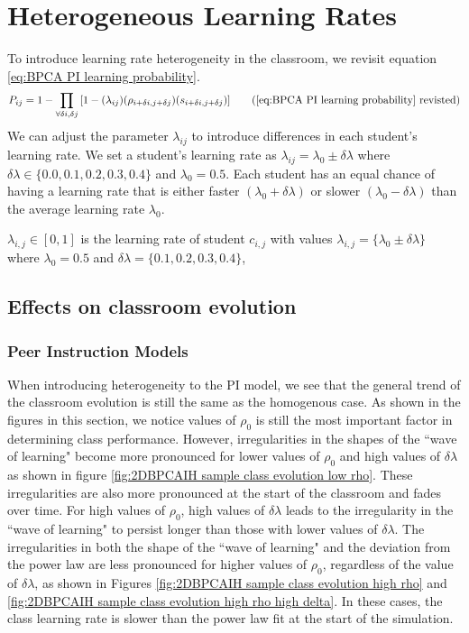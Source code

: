 \chapter{Heterogeneous Learning Rates}

To introduce learning rate heterogeneity in the classroom, we revisit equation \ref{eq:BPCA PI learning probability}. 
\begin{equation*}
    P_{ij} = 1 - \prod_{\forall \delta i, \delta j}{\lbrack1-(\lambda_{ij})(\rho_{i+\delta i, j+\delta j})(s_{i+\delta i, j+\delta j})}\rbrack
    \tag{\ref{eq:BPCA PI learning probability} revisted}
\end{equation*}
We can adjust the parameter $\lambda_{ij}$ to introduce differences in each student's learning rate. 
We set a student's learning rate as $\lambda_{ij} = \lambda_0 \pm \delta\lambda$ where $\delta\lambda \in \lbrace 0.0,0.1, 0.2, 0.3, 0.4\rbrace$ and $\lambda_0 = 0.5$. 
Each student has an equal chance of having a learning rate that is either faster $(\lambda_0 + \delta\lambda)$ or slower $(\lambda_0 - \delta\lambda)$ than the average learning rate $\lambda_0$. 

$\lambda_{i,j} \in [0,1]$ is the learning rate of student $c_{i,j}$ with values $\lambda_{i,j} = \lbrace \lambda_0 \pm \delta \lambda \rbrace$ where $\lambda_0 = 0.5$ and $\delta \lambda = \lbrace 0.1, 0.2, 0.3, 0.4 \rbrace$, 

\section{Effects on classroom evolution}\label{sec:BPCAIH effects on classroom evolution}
\subsection{Peer Instruction Models}\label{sec:BPCAIH effects on classroom evolution PI}
When introducing heterogeneity to the PI model, we see that the general trend of the classroom evolution is still the same as the homogenous case.
As shown in the figures in this section, we notice values of $\rho_0$ is still the most important factor in determining class performance. 
However, irregularities in the shapes of the ``wave of learning" become more pronounced for lower values of $\rho_0$ and high values of $\delta\lambda$ as shown in figure \ref{fig:2DBPCAIH sample class evolution low rho}.
These irregularities are also more pronounced at the start of the classroom and fades over time.
For high values of $\rho_0$, high values of $\delta\lambda$ leads to the irregularity in the ``wave of learning" to persist longer than those with lower values of $\delta\lambda$.
The irregularities in both the shape of the ``wave of learning" and the deviation from the power law are less pronounced for higher values of $\rho_0$, regardless of the value of $\delta\lambda$, as shown in Figures \ref{fig:2DBPCAIH sample class evolution high rho} and \ref{fig:2DBPCAIH sample class evolution high rho high delta}.
In these cases, the class learning rate is slower than the power law fit at the start of the simulation.

